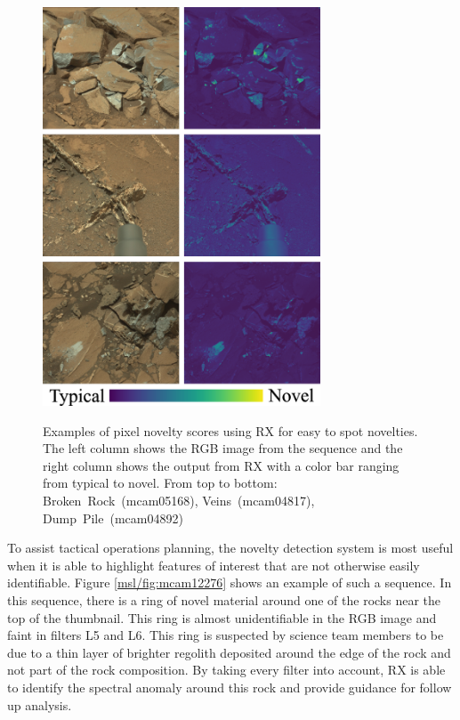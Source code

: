 \begin{figure}
\centering
\includegraphics[width=3.25in]{figs/msl/easy.png}\\
\caption[]{Examples of pixel novelty scores using RX for easy to spot novelties. The left column shows the RGB image from the sequence and the right column shows the output from RX with a color bar ranging from typical to novel. From top to bottom: \mbox{Broken Rock (mcam05168)}, \mbox{Veins (mcam04817)}, \mbox{Dump Pile (mcam04892)}}
\label{msl/fig:easyNovel}
\end{figure}

To assist tactical operations planning, the novelty detection system is most useful when it is able to highlight features of interest that are not otherwise easily identifiable. 
Figure \ref{msl/fig:mcam12276} shows an example of such a sequence.
In this sequence, there is a ring of novel material around one of the rocks near the top of the thumbnail. 
This ring is almost unidentifiable in the RGB image and faint in filters L5 and L6. 
This ring is suspected by science team members to be due to a thin layer of brighter regolith deposited around the edge of the rock and not part of the rock composition.
By taking every filter into account, RX is able to identify the spectral anomaly around this rock and provide guidance for follow up analysis.


